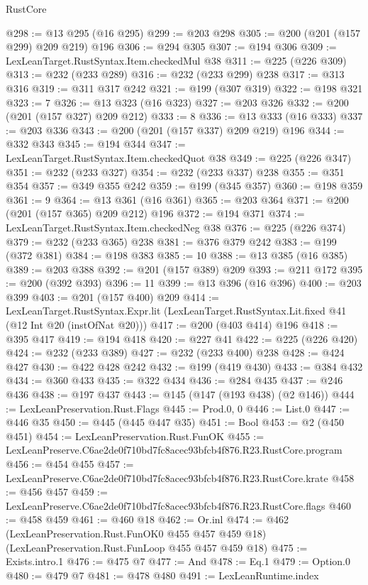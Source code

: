 \begin{lexlean}{RustCore}
\begin{coremodule}
@298 := @13 @295 (@16 @295)
@299 := @203 @298
@305 := @200 (@201 (@157 @299) @209 @219) @196
@306 := @294 @305
@307 := @194 @306
@309 := LexLeanTarget.RustSyntax.Item.checkedMul @38
@311 := @225 (@226 @309)
@313 := @232 (@233 @289)
@316 := @232 (@233 @299) @238
@317 := @313 @316
@319 := @311 @317 @242
@321 := @199 (@307 @319)
@322 := @198 @321
@323 := 7
@326 := @13 @323 (@16 @323)
@327 := @203 @326
@332 := @200 (@201 (@157 @327) @209 @212)
@333 := 8
@336 := @13 @333 (@16 @333)
@337 := @203 @336
@343 := @200 (@201 (@157 @337) @209 @219) @196
@344 := @332 @343
@345 := @194 @344
@347 := LexLeanTarget.RustSyntax.Item.checkedQuot @38
@349 := @225 (@226 @347)
@351 := @232 (@233 @327)
@354 := @232 (@233 @337) @238
@355 := @351 @354
@357 := @349 @355 @242
@359 := @199 (@345 @357)
@360 := @198 @359
@361 := 9
@364 := @13 @361 (@16 @361)
@365 := @203 @364
@371 := @200 (@201 (@157 @365) @209 @212) @196
@372 := @194 @371
@374 := LexLeanTarget.RustSyntax.Item.checkedNeg @38
@376 := @225 (@226 @374)
@379 := @232 (@233 @365) @238
@381 := @376 @379 @242
@383 := @199 (@372 @381)
@384 := @198 @383
@385 := 10
@388 := @13 @385 (@16 @385)
@389 := @203 @388
@392 := @201 (@157 @389) @209
@393 := @211 @172
@395 := @200 (@392 @393)
@396 := 11
@399 := @13 @396 (@16 @396)
@400 := @203 @399
@403 := @201 (@157 @400) @209
@414 := LexLeanTarget.RustSyntax.Expr.lit
    (LexLeanTarget.RustSyntax.Lit.fixed @41 (@12 Int @20 (instOfNat @20)))
@417 := @200 (@403 @414) @196
@418 := @395 @417
@419 := @194 @418
@420 := @227 @41
@422 := @225 (@226 @420)
@424 := @232 (@233 @389)
@427 := @232 (@233 @400) @238
@428 := @424 @427
@430 := @422 @428 @242
@432 := @199 (@419 @430)
@433 := @384 @432
@434 := @360 @433
@435 := @322 @434
@436 := @284 @435
@437 := @246 @436
@438 := @197 @437
@443 := @145 (@147 (@193 @438) (@2 @146))
@444 := LexLeanPreservation.Rust.Flags
@445 := Prod.{0, 0}
@446 := List.{0}
@447 := @446 @35
@450 := @445 (@445 @447 @35)
@451 := Bool
@453 := @2 (@450 @451)
@454 := LexLeanPreservation.Rust.FunOK
@455 := LexLeanPreserve.C6ae2de0f710bd7fc8acec93bfcb4f876.R23.RustCore.program
@456 := @454 @455
@457 := LexLeanPreserve.C6ae2de0f710bd7fc8acec93bfcb4f876.R23.RustCore.krate
@458 := @456 @457
@459 := LexLeanPreserve.C6ae2de0f710bd7fc8acec93bfcb4f876.R23.RustCore.flags
@460 := @458 @459
@461 := @460 @18
@462 := Or.inl
@474 := @462
    (LexLeanPreservation.Rust.FunOK0 @455 @457 @459 @18)
    (LexLeanPreservation.Rust.FunLoop @455 @457 @459 @18)
@475 := Exists.intro.{1}
@476 := @475 @7
@477 := And
@478 := Eq.{1}
@479 := Option.{0}
@480 := @479 @7
@481 := @478 @480
@491 := LexLeanRuntime.index

\end{coremodule}
\end{lexlean}
